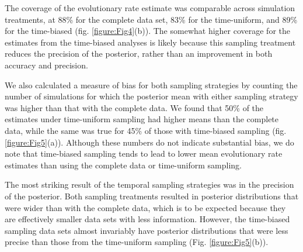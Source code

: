 \documentclass[11pt]{article}
\begin{document}
The coverage of the evolutionary rate estimate was comparable across simulation treatments, at 88\% for the complete data set, 83\% for the time-uniform, and 89\% for the time-biased (fig. \ref{figure:Fig4}(b)). The somewhat higher coverage for the estimates from the time-biased analyses is likely because this sampling treatment reduces the precision of the posterior, rather than an improvement in both accuracy and precision.

We also calculated a measure of bias for both sampling strategies by counting the number of simulations for which the posterior mean with either sampling strategy was higher than that with the complete data. We found that 50\% of the estimates under time-uniform sampling had higher means than the complete data, while the same was true for 45\% of those with time-biased sampling (fig. \ref{figure:Fig5}(a)). Although these numbers do not indicate substantial bias, we do note that time-biased sampling tends to lead to lower mean evolutionary rate estimates than using the complete data or time-uniform sampling.

The most striking result of the temporal sampling strategies was in the precision of the posterior. Both sampling treatments resulted in posterior distributions that were wider than with the complete data, which is to be expected because they are effectively smaller data sets with less information. However, the time-biased sampling data sets almost invariably have posterior distributions that were less precise than those from the time-uniform sampling (Fig. \ref{figure:Fig5}(b)).
\end{document}
